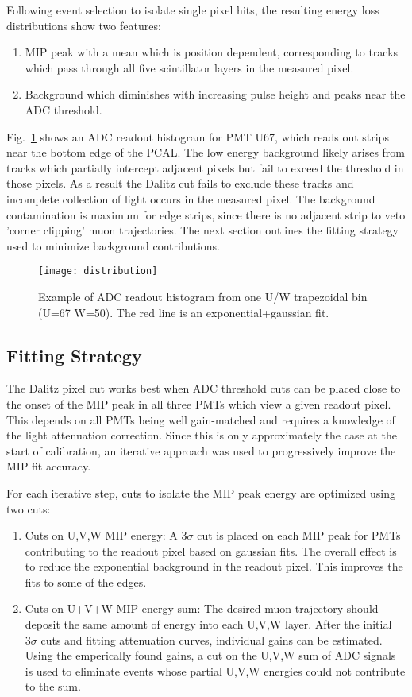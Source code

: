 Following event selection to isolate single pixel hits, the resulting energy loss distributions show two features:

\begin{enumerate}
\item MIP peak with a mean which is position dependent, corresponding to tracks which pass through all five scintillator layers in the measured pixel.
\item Background which diminishes with increasing pulse height and peaks near the ADC threshold.
\end{enumerate}

Fig.~\ref{fig:distribution} shows an ADC readout histogram for PMT U67, which reads out strips near the bottom edge of the PCAL.  The low energy background likely arises from tracks which partially intercept adjacent pixels but fail to exceed the threshold in those pixels.  As a result the Dalitz cut fails to exclude these tracks and incomplete collection of light occurs in the measured pixel.  The background contamination is maximum for edge strips, since there is no adjacent strip to veto 'corner clipping' muon trajectories.  The next section outlines the fitting strategy used to minimize background contributions.
	
\begin{figure}[h]
    \centering
    \texttt{[image: distribution]}
    \caption{Example of ADC readout histogram from one U/W trapezoidal bin (U=67 W=50).  The red line is an exponential+gaussian fit.}
    \label{fig:distribution}
\end{figure}

\subsection{Fitting Strategy}

The Dalitz pixel cut works best when ADC threshold cuts can be placed close to the onset of the MIP peak in all three PMTs which view a given readout pixel.  This depends on all PMTs being well gain-matched and requires a knowledge of the light attenuation correction.  Since this is only approximately the case at the start of calibration, an iterative approach was used to progressively improve the MIP fit accuracy. 

For each iterative step, cuts to isolate the MIP peak energy are optimized using two cuts:
\begin{enumerate}
    \item Cuts on U,V,W MIP energy: A $3\sigma$ cut is placed on each MIP peak for PMTs contributing to the readout pixel based on gaussian fits.  The overall effect is to reduce the exponential background in the readout pixel. This improves the fits to some of the edges.
    \item Cuts on U+V+W MIP energy sum: The desired muon trajectory should deposit the same amount of energy into each U,V,W layer. After the initial $3\sigma$ cuts and fitting attenuation curves, individual gains can be estimated. Using the emperically found gains, a cut on the U,V,W sum of ADC signals is used to eliminate events whose partial U,V,W energies could not contribute to the sum.\end{enumerate}

